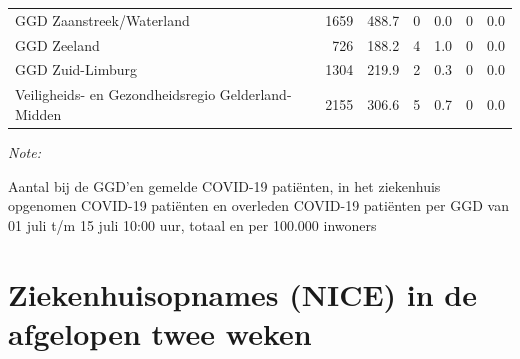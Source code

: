 \documentclass[
  english,
  man,floatsintext]{apa6}
\begin{document}
\begin{table}
\begin{threeparttable}
\begin{tabular}{lrrrrrr}
GGD Zaanstreek/Waterland & 1659 & 488.7 & 0 & 0.0 & 0 & 0.0\\
GGD Zeeland & 726 & 188.2 & 4 & 1.0 & 0 & 0.0\\
GGD Zuid-Limburg & 1304 & 219.9 & 2 & 0.3 & 0 & 0.0\\
Veiligheids- en Gezondheidsregio Gelderland-Midden & 2155 & 306.6 & 5 & 0.7 & 0 & 0.0\\
\bottomrule
\end{tabular}
\begin{tablenotes}
\item \textit{Note: } 
\item Aantal bij de GGD’en gemelde COVID-19 patiënten, in het ziekenhuis opgenomen COVID-19 patiënten en overleden COVID-19 patiënten per GGD van 01 juli t/m 15 juli 10:00 uur, totaal en per 100.000 inwoners
\end{tablenotes}
\end{threeparttable}
\endgroup{}
\end{table}

\newpage

\hypertarget{ziekenhuisopnames-nice-in-de-afgelopen-twee-weken}{%
\section{Ziekenhuisopnames (NICE) in de afgelopen twee weken}\label{ziekenhuisopnames-nice-in-de-afgelopen-twee-weken}}
\end{document}
